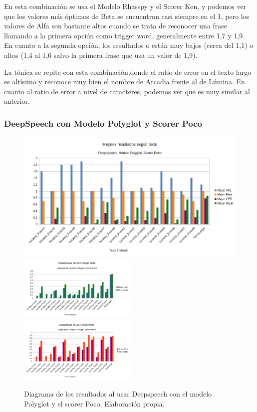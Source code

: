 En esta combinación se usa el Modelo Rhasspy y el Scorer Ken, y podemos ver que los valores más óptimos de Beta se encuentran casi siempre en el 1, pero los valores de Alfa son bastante altos cuando se trata de reconocer una frase llamando a la primera opción como trigger word, generalmente entre 1,7 y 1,9. En cuanto a la segunda opción, los resultados o están muy bajos (cerca del 1,1) o altos (1,4 al 1,6 salvo la primera frase que usa un valor de 1,9).

La tónica se repite con esta combinación,donde el ratio de error en el texto largo es altísimo y reconoce muy bien el nombre de Arcadia frente al de Lúmina. En cuanto al ratio de error a nivel de caracteres, podemos ver que es muy similar al anterior.

\subsubsection{DeepSpeech con Modelo Polyglot y Scorer Poco}

\begin{figure}[H]
	\includegraphics[width=\textwidth]{imagenes/MejoresResultados_DeepSpeechIvanPocoPolyglot.png} \\
	\includegraphics[width=0.5\textwidth]{imagenes/CER_DeepSpeechIvanPocoPolyglot.png} \hfill \includegraphics[width=0.5\textwidth]{imagenes/WER_DeepspeechIvanPocoPolyglot.png}
	\caption[Diagramas de Alfa, Beta, WER y CER - Polyglot y Poco]{Diagrama de los resultados al usar Deepspeech con el modelo Polyglot y el scorer Poco. Elaboración propia.}
\end{figure}

